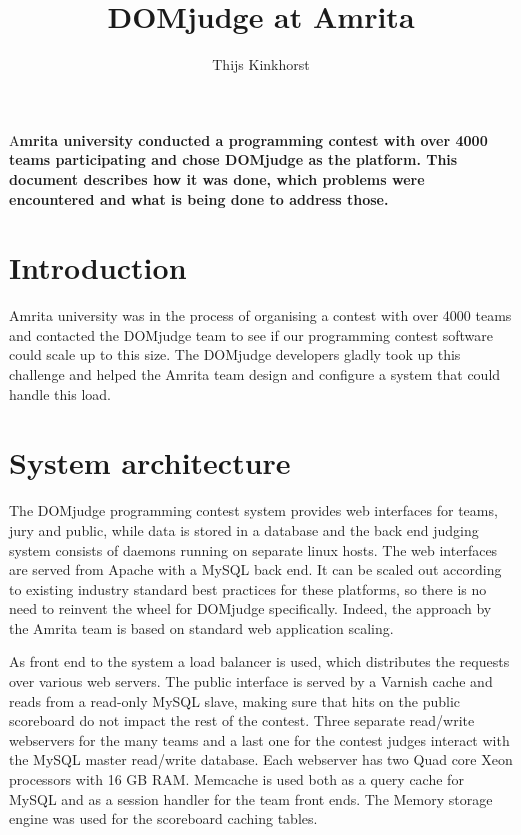\documentclass[DIV=calc, paper=a4, fontsize=11pt, twocolumn]{scrartcl}	 %
\title{DOMjudge at Amrita} %
\author{Thijs Kinkhorst} %
\date{} %
\newcommand{\initial}[1]{ %
\lettrine[lines=3,lhang=0.3,nindent=0em]{
\color{DarkGoldenrod}
{\textsf{#1}}}{}}
\begin{document}
\maketitle %

\thispagestyle{fancy} %


\initial{A}\textbf{mrita university conducted a programming contest
  with over 4000 teams participating and chose DOMjudge as the
  platform. This document describes how it was done, which problems
  were encountered and what is being done to address those.}


\section*{Introduction}
Amrita university was in the process of organising a contest with over
4000 teams and contacted the DOMjudge team to see if our
programming contest software could scale up to this size. The DOMjudge
developers gladly took up this challenge and helped the Amrita team
design and configure a system that could handle this load.


\section*{System architecture}

The DOMjudge programming contest system provides web interfaces for
teams, jury and public, while data is stored in a database and the
back end judging system consists of daemons running on separate linux
hosts. The web interfaces are served from Apache with
a MySQL back end. It can be scaled out according to existing industry standard
best practices for these platforms, so there is no need to reinvent the wheel
for DOMjudge specifically. Indeed, the approach by the Amrita team is
based on standard web application scaling.

As front end to the system a load balancer is used, which
distributes the requests over various web servers. The public interface is
served by a Varnish cache and reads from a read-only MySQL slave, making sure
that hits on the public scoreboard do not impact the rest of the contest.
Three separate read/write webservers for the many teams and a last one for
the contest judges interact with the MySQL master read/write
database. Each webserver has two Quad core Xeon processors with 16 GB RAM.
Memcache is used both as a query cache for MySQL and as a session handler for
the team front ends. The Memory storage engine was used for the
scoreboard caching tables.
\end{document}
